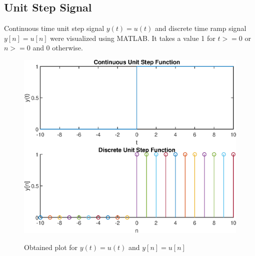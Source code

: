\documentclass{lab_sheet}
\begin{document}
    \subsection{Unit Step Signal}
    Continuous time unit step signal $y(t)= u(t)$ and discrete time ramp signal $y[n]=u[n]$ were visualized using MATLAB. It takes a value 1 for $t>=0$ or $n>=0$ and 0 otherwise.
    \begin{figure}[H]
        \centering
        \includegraphics[scale=0.6]{./Figures/unit_step}
        \label{fig:unit_step}
        \caption{Obtained plot for $y(t)=u(t)$ and $y[n]=u[n]$}
    \end{figure}
\end{document}
